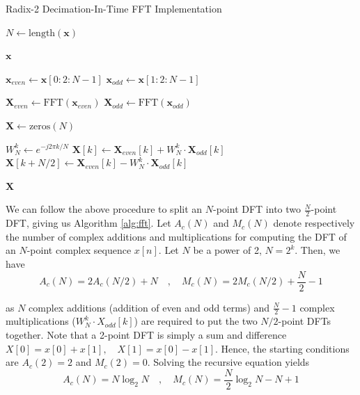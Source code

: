 \documentclass[8pt]{extarticle}
\begin{document}
\begin{algorithm}
\caption{Radix-2 Decimation-In-Time FFT Implementation}\label{alg:fft}
\begin{algorithmic}[1]
    \State $N \gets \text{length}(\mathbf{x})$
    
        \State \Return $\mathbf{x}$ 
    \EndIf
    
    \State $\mathbf{x}_{even} \gets \mathbf{x}[0:2:N-1]$ 
    \State $\mathbf{x}_{odd} \gets \mathbf{x}[1:2:N-1]$ 
    
    \State $\mathbf{X}_{even} \gets \text{FFT}(\mathbf{x}_{even})$ 
    \State $\mathbf{X}_{odd} \gets \text{FFT}(\mathbf{x}_{odd})$ 
    
    \State $\mathbf{X} \gets \text{zeros}(N)$ 
    
        \State $W_N^k \gets e^{-j2\pi k/N}$ 
        \State $\mathbf{X}[k] \gets \mathbf{X}_{even}[k] + W_N^k \cdot \mathbf{X}_{odd}[k]$ 
        \State $\mathbf{X}[k+N/2] \gets \mathbf{X}_{even}[k] - W_N^k \cdot \mathbf{X}_{odd}[k]$ 
    \EndFor
    
    \State \Return $\mathbf{X}$
\EndFunction
\end{algorithmic}
\end{algorithm}

We can follow the above procedure to split an $N$-point DFT into two $\frac{N}{2}$-point DFT, giving us Algorithm \autoref{alg:fft}. Let $A_c(N)$ and $M_c(N)$ denote respectively the number of complex additions and multiplications for computing the DFT of an $N$-point complex sequence $x[n]$. Let $N$ be a power of 2, $N = 2^k$. Then, we have
\begin{equation*}
    A_c(N) = 2 A_c(N/2) + N \quad , \quad M_c(N) = 2 M_c(N/2) + \frac{N}{2} - 1
\end{equation*}

as $N$ complex additions (addition of even and odd terms) and $\frac{N}{2} - 1$ complex multiplications ($W_N^{k} \cdot X_{odd}[k]$)  are required to put the two $N/2$-point DFTs together. Note that a 2-point DFT is simply a sum and difference $X[0] = x[0] + x[1] , \quad X[1] = x[0] - x[1]$. Hence, the starting conditions are $A_c(2) = 2$ and $M_c(2) = 0$. Solving the recursive equation yields
\begin{equation*}
A_c(N) = N \log_2 N  \quad , \quad M_c(N) = \frac{N}{2} \log_2 N - N + 1
\end{equation*}
\end{document}
